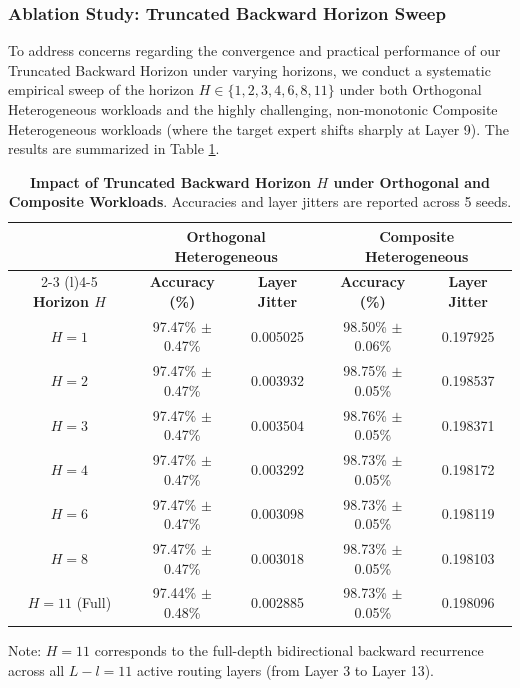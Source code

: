 \subsubsection{Ablation Study: Truncated Backward Horizon Sweep}
To address concerns regarding the convergence and practical performance of our Truncated Backward Horizon under varying horizons, we conduct a systematic empirical sweep of the horizon $H \in \{1, 2, 3, 4, 6, 8, 11\}$ under both Orthogonal Heterogeneous workloads and the highly challenging, non-monotonic Composite Heterogeneous workloads (where the target expert shifts sharply at Layer 9). The results are summarized in Table \ref{tab:horizon_sweep}.

\begin{table}[t]
\caption{\textbf{Impact of Truncated Backward Horizon $H$ under Orthogonal and Composite Workloads}. Accuracies and layer jitters are reported across 5 seeds.}
\label{tab:horizon_sweep}
\vskip 0.1in
\begin{center}
\begin{small}
\begin{tabular}{ccccc}
\toprule
& \multicolumn{2}{c}{\textbf{Orthogonal Heterogeneous}} & \multicolumn{2}{c}{\textbf{Composite Heterogeneous}} \\
\cmidrule(r){2-3} \cmidrule(l){4-5}
\textbf{Horizon $H$} & \textbf{Accuracy (\%)} & \textbf{Layer Jitter} & \textbf{Accuracy (\%)} & \textbf{Layer Jitter} \\
\midrule
$H = 1$  & 97.47\% $\pm$ 0.47\% & 0.005025 & 98.50\% $\pm$ 0.06\% & 0.197925 \\
$H = 2$  & 97.47\% $\pm$ 0.47\% & 0.003932 & 98.75\% $\pm$ 0.05\% & 0.198537 \\
$H = 3$  & 97.47\% $\pm$ 0.47\% & 0.003504 & 98.76\% $\pm$ 0.05\% & 0.198371 \\
$H = 4$  & 97.47\% $\pm$ 0.47\% & 0.003292 & 98.73\% $\pm$ 0.05\% & 0.198172 \\
$H = 6$  & 97.47\% $\pm$ 0.47\% & 0.003098 & 98.73\% $\pm$ 0.05\% & 0.198119 \\
$H = 8$  & 97.47\% $\pm$ 0.47\% & 0.003018 & 98.73\% $\pm$ 0.05\% & 0.198103 \\
$H = 11$ (Full) & 97.44\% $\pm$ 0.48\% & 0.002885 & 98.73\% $\pm$ 0.05\% & 0.198096 \\
\bottomrule
\end{tabular}
\par\vskip 0.05in\parbox{\linewidth}{\scriptsize Note: $H = 11$ corresponds to the full-depth bidirectional backward recurrence across all $L - l = 11$ active routing layers (from Layer 3 to Layer 13).}
\end{small}
\end{center}
\vskip -0.1in
\end{table}

